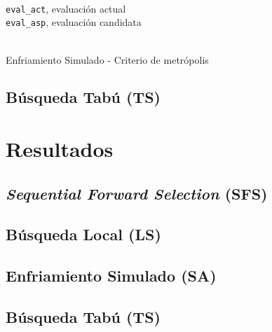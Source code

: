 \documentclass[a4paper, 11pt]{article}
\begin{document}
			\begin{algorithm}[H]
				\begin{algorithmic}[1]
					\REQUIRE \ \\
						\texttt{eval\_act}, evaluación actual \\
						\texttt{eval\_asp}, evaluación candidata \\ \
							 

				  		\ENDIF
				  	\ENDIF
				  	
				\end{algorithmic}
			\caption{Enfriamiento Simulado - Criterio de metrópolis}
			\label{SA-mCrit}
			\end{algorithm}

		\subsection{Búsqueda Tabú (\textbf{TS})}
			
	\section{Resultados}
		\subsection{\textit{Sequential Forward Selection} (\textbf{SFS})}
			
			
			
		
		\subsection{Búsqueda Local (\textbf{LS})}
			
			
			

		\subsection{Enfriamiento Simulado (\textbf{SA})}
			
			
			
		
		\subsection{Búsqueda Tabú (\textbf{TS})}
			
			
			
			
\end{document}
